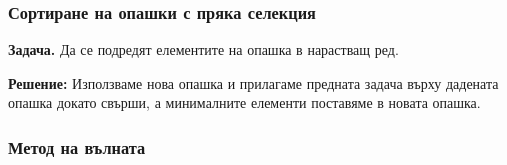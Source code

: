 \documentclass[alsotrans,beameroptions={aspectratio=169}]{beamerswitch}
\begin{document}
\begin{frame}
  \frametitle{Сортиране на опашки с пряка селекция}

\textbf{Задача.} Да се подредят елементите на опашка в нарастващ ред.
\vspace{1em}
\pause

\textbf{Решение:} Използваме нова опашка и прилагаме предната задача върху дадената опашка докато свърши, а минималните елементи поставяме в новата опашка.
\end{frame}

\begin{frame}
  \frametitle{Метод на вълната}

  \scriptsize
  \begin{center}
\end{center}
\end{frame}
\end{document}
